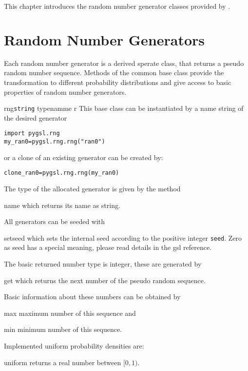 
This chapter introduces the random number generator classes provided by .

\section{Random Number Generators}

Each random number generator is a derived sperate class, that returns
a pseudo random number sequence. Methods of the common base class 
provide the transformation to different probability distributions and
give access to basic properties of random number generators.
\begin{classdesc}{rng}{\texttt{string} typenamme \code{|}  r}
This base class can be instantiated by a name string of the desired generator
\begin{verbatim}
import pygsl.rng
my_ran0=pygsl.rng.rng("ran0")
\end{verbatim}
or a clone of an existing generator can be created by:
\begin{verbatim}
clone_ran0=pygsl.rng.rng(my_ran0)
\end{verbatim}
\end{classdesc}
The type of the allocated generator is given by the method
\begin{methoddesc}{name}{}
which returns its name as string.
\end{methoddesc}
All generators can be seeded with
\begin{methoddesc}{set}{seed}
which sets the internal seed according to the positive integer {\tt seed}. Zero as seed
has a special meaning, please read details in the gsl reference.
\end{methoddesc}
The basic returned number type is integer, these are generated by
\begin{methoddesc}{get}{}
which returns the next number of the pseudo random sequence.
\end{methoddesc}
Basic information about these numbers can be obtained by
\begin{methoddesc}{max}{}
maximum number of this sequence and
\end{methoddesc}
\begin{methoddesc}{min}{}
minimum number of this sequence.
\end{methoddesc}
Implemented uniform probability densities are:
\begin{methoddesc}{uniform}{}
returns a real number between $[0,1)$.
\end{methoddesc}
